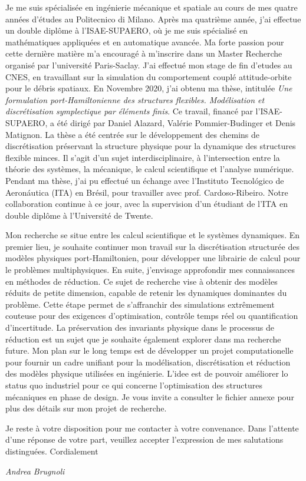 \documentclass[11pt]{letter}
\begin{document}
	Je me suis spécialisée en ingénierie mécanique et spatiale au cours de mes quatre années d'études au Politecnico di Milano. Après ma quatrième année, j'ai effectue un double diplôme \`a l'ISAE-SUPAERO, o\`u je me suis spécialisé en mathématiques appliquées et en automatique avancée. Ma forte passion pour cette dernière matière m'a encouragé à m'inscrire dans un Master Recherche organisé par l'université Paris-Saclay. J'ai effectué mon stage de fin d'etudes au CNES, en travaillant sur la simulation du comportement couplé attitude-orbite pour le débris spatiaux. En Novembre 2020, j'ai obtenu ma thèse, intitulée \textit{Une formulation port-Hamiltonienne des structures flexibles. Modélisation et discrétisation symplectique par éléments finis}. Ce travail, financé par l'ISAE-SUPAERO, a été dirigé par Daniel Alazard, Valérie Pommier-Budinger et Denis Matignon. La thèse a été centrée sur le développement des chemins de discrétisation préservant la structure physique pour la dynamique des structures flexible minces. Il s'agit d'un sujet interdisciplinaire, \`a l'intersection entre la théorie des systèmes, la mécanique, le calcul scientifique et l'analyse numérique. Pendant ma thèse, j'ai pu effectué un échange avec l'Instituto Tecnológico de Aeronáutica (ITA) en Brésil, pour travailler avec prof. Cardoso-Ribeiro. Notre collaboration continue \`a ce jour, avec la supervision d'un étudiant de l'ITA en double diplôme \`a l'Universit\'e de Twente.
	
	Mon recherche se situe entre les calcul scientifique et le systèmes dynamiques. En premier lieu, je souhaite continuer mon travail sur la discrétisation structurée des modèles physiques port-Hamiltonien, pour développer une librairie de calcul pour le problèmes multiphysiques. En suite, j'envisage approfondir mes connaissances en méthodes de réduction. Ce sujet de recherche vise \`a obtenir des modèles réduits de petite dimension, capable de retenir les dynamiques dominantes du problème. Cette étape permet de s'affranchir des simulations extrêmement couteuse pour des exigences d'optimisation, contrôle temps réel ou quantification d'incertitude. La préservation des invariants physique dans le processus de réduction est un sujet que je souhaite également explorer dans ma recherche future. Mon plan sur le long temps est de développer un projet computationelle pour fournir un cadre unifiant pour la modélisation, discrétisation et réduction des modèles physique utilisées en ingénierie. L'idee est de pouvoir améliorer lo status quo industriel pour ce qui concerne l'optimisation des structures mécaniques en phase de design. Je vous invite a consulter le fichier annexe pour plus des détails sur mon projet de recherche. 
	

	Je reste à votre disposition pour me contacter à votre convenance. Dans l'attente d'une réponse de votre part, veuillez accepter l'expression de mes salutations distinguées. Cordialement
	
	
	\begin{center}
		\large\textit{Andrea Brugnoli}
	\end{center}
\end{document}
